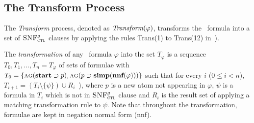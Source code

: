 \documentclass{article}
\begin{document}



\subsection{The Transform Process}
The \emph{Transform} process, denoted as $\emph{Transform}(\varphi)$, transforms the \CTL\ formula into a set of ${\textsc{SNF}_{\textsc{ctl}}^g}$ clauses by applying  the rules  Trans(1) to Trans(12) in~\cite{zhang2009refined}).

The \emph{transformation} of any \CTL\ formula $\varphi$ into the set $T_{\varphi}$ is a sequence $T_0, T_1,\dots, T_n=T_{\varphi}$ of sets of formulae with $T_0=\{\textsc{a} \textsc{g}(\textbf{start} \supset p), \textsc{a} \textsc{g}(p \supset \textbf{simp}(\textbf{nnf}(\varphi)))\}$ such that for every $i$ ($0 \leq i< n$), $T_{i+1} = (T_i \setminus \{\psi\}) \cup R_i$~\cite{zhang2009refined}), where $p$ is a new atom not appearing in $\varphi$, $\psi$ is a formula in $T_i$ which is not in ${\textsc{SNF}_{\textsc{ctl}}^g}$ clause and $R_i$ is the result set of applying a matching transformation rule to $\psi$. Note that throughout the transformation, formulae are kept in negation normal form (nnf).
\end{document}
